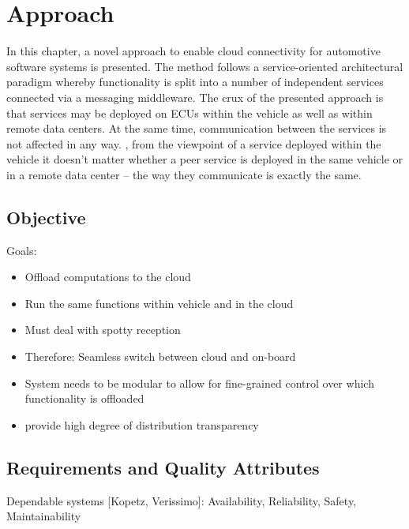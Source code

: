 
\chapter{Approach}\label{chapter:realization}

In this chapter, a novel approach to enable cloud connectivity for automotive software systems is presented. The method follows a service-oriented architectural paradigm whereby functionality is split into a number of independent services connected via a messaging middleware.  
The crux of the presented approach is that services may be deployed on ECUs within the vehicle as well as within remote data centers. At the same time, communication between the services is not affected in any way. \Ie , from the viewpoint of a service deployed within the vehicle it doesn't matter whether a peer service is deployed in the same vehicle or in a remote data center -- the way they communicate is exactly the same.

%
%
%
%
%
%
%
%
%
%

\section{Objective}

Goals:
\begin{itemize}
\item Offload computations to the cloud
\item Run the same functions within vehicle and in the cloud
\item Must deal with spotty reception
\item Therefore: Seamless switch between cloud and on-board
\item System needs to be modular to allow for fine-grained control over which functionality is offloaded 
\item provide high degree of distribution transparency
\end{itemize}


\section{Requirements and Quality Attributes}
Dependable systems [Kopetz, Verissimo]: Availability, Reliability, Safety, Maintainability


